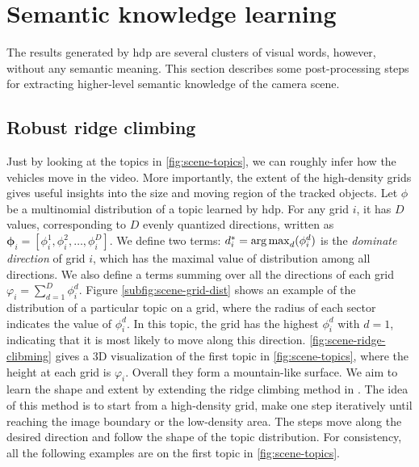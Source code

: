 \section{Semantic knowledge learning}
\label{sec:scene-ridge-climbing}
The results generated by \gls{hdp} are several clusters of visual words, however, without any semantic meaning.
This section describes some post-processing steps for extracting higher-level semantic knowledge of the camera scene.

\subsection{Robust ridge climbing}
    Just by looking at the topics in \ref{fig:scene-topics}, we can roughly infer how the vehicles move in the video. 
    More importantly, the extent of the high-density grids gives useful insights into the size and moving region of the tracked objects. 
    Let $\phi$ be a multinomial distribution of a topic learned by \gls{hdp}. For any grid $i$, it has $D$ values, corresponding to $D$ evenly quantized directions, written as $\bm{\phi}_i= [\phi_i^{1}, \phi_i^{2}, \dots, \phi_i^{D}]$.
    We define two terms:
    $d^*_i = \operatorname*{arg\,max}_{d}(\phi_i^{d})$ is the \emph{dominate direction} of grid $i$, which has the maximal value of distribution among all directions.
    We also define a terms summing over all the directions of each grid $\varphi_{i} = \sum_{d=1}^{D}{\phi_i^{d}}$.
    Figure \ref{subfig:scene-grid-dist} shows an example of the distribution of a particular topic on a grid, where the radius of each sector indicates the value of $\phi_i^{d}$. 
    In this topic, the grid has the highest $\phi_i^d$ with $d=1$, indicating that it is most likely to move along this direction. 
    \ref{fig:scene-ridge-clibming} gives a 3D visualization of the first topic in \ref{fig:scene-topics}, where the height at each grid is $\varphi_{i}$. 
    Overall they form a mountain-like surface. We aim to learn the shape and extent by extending the ridge climbing method in \cite{zhao2013counting}. 
    The idea of this method is to start from a high-density grid, make one step iteratively until reaching the image boundary or the low-density area. 
    The steps move along the desired direction and follow the shape of the topic distribution. 
    For consistency, all the following examples are on the first topic in \ref{fig:scene-topics}.
    
    

